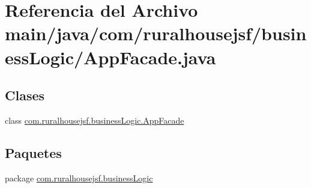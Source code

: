 \hypertarget{a00002}{}\section{Referencia del Archivo main/java/com/ruralhousejsf/business\+Logic/\+App\+Facade.java}
\label{a00002}
\subsection*{Clases}
\begin{DoxyCompactItemize}
\item 
class \mbox{\hyperlink{a00128}{com.\+ruralhousejsf.\+business\+Logic.\+App\+Facade}}
\end{DoxyCompactItemize}
\subsection*{Paquetes}
\begin{DoxyCompactItemize}
\item 
package \mbox{\hyperlink{a00108}{com.\+ruralhousejsf.\+business\+Logic}}
\end{DoxyCompactItemize}
